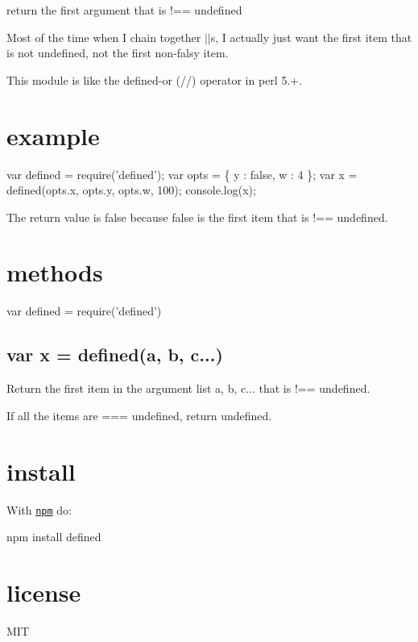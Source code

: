 return the first argument that is {\ttfamily !== undefined}

\href{http://ci.testling.com/substack/defined}{\tt }

\href{http://travis-ci.org/substack/defined}{\tt }

Most of the time when I chain together {\ttfamily $\vert$$\vert$}s, I actually just want the first item that is not {\ttfamily undefined}, not the first non-\/falsy item.

This module is like the defined-\/or ({\ttfamily //}) operator in perl 5.+.

\section*{example}


\begin{DoxyCode}
var defined = require('defined');
var opts = \{ y : false, w : 4 \};
var x = defined(opts.x, opts.y, opts.w, 100);
console.log(x);
\end{DoxyCode}





The return value is {\ttfamily false} because {\ttfamily false} is the first item that is {\ttfamily !== undefined}.

\section*{methods}


\begin{DoxyCode}
var defined = require('defined')
\end{DoxyCode}


\subsection*{var x = defined(a, b, c...)}

Return the first item in the argument list {\ttfamily a, b, c...} that is {\ttfamily !== undefined}.

If all the items are {\ttfamily === undefined}, return undefined.

\section*{install}

With \href{https://npmjs.org}{\tt npm} do\+:


\begin{DoxyCode}
npm install defined
\end{DoxyCode}


\section*{license}

M\+IT 